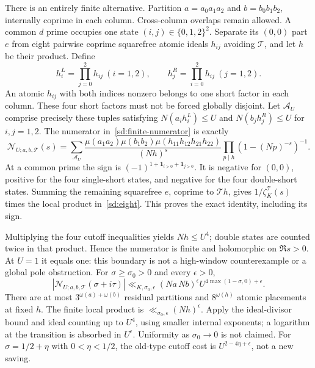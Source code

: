 There is an entirely finite alternative. Partition
$a=a_0a_1a_2$ and $b=b_0b_1b_2$, internally coprime in each column.
Cross-column overlaps remain allowed. A common $d$ prime occupies one
state $(i,j)\in\{0,1,2\}^2$. Separate its $(0,0)$ part $e$ from eight
pairwise coprime squarefree atomic ideals $h_{ij}$ avoiding $\mathcal T$,
and let $h$ be their product. Define
\[
 h_i^L=\prod_{j=0}^2h_{ij}\ (i=1,2),\qquad
 h_j^R=\prod_{i=0}^2h_{ij}\ (j=1,2).
\]
An atomic $h_{ij}$ with both indices nonzero belongs to one short
factor in each column. These four short factors must not be forced
globally disjoint. Let $\mathcal A_U$ comprise precisely these tuples
satisfying
$N(a_i h_i^L)\le U$ and $N(b_jh_j^R)\le U$ for $i,j=1,2$.
The numerator in~\eqref{sd:finite-numerator} is exactly
\begin{equation}\label{sd:eight}
 \mathcal N_{U;a,b,\mathcal T}(s)=
 \sum_{\mathcal A_U}
 \frac{\mu(a_1a_2)\mu(b_1b_2)
       \mu(h_{11}h_{12}h_{21}h_{22})}{(Nh)^s}
       \prod_{p\mid h}(1-(Np)^{-s})^{-1}.
\end{equation}
At a common prime the sign is
$(-1)^{1+\mathbf1_{i>0}+\mathbf1_{j>0}}$.
It is negative for $(0,0)$, positive for the four single-short states,
and negative for the four double-short states. Summing the remaining
squarefree $e$, coprime to $\mathcal T h$, gives
$1/\zeta_K^{\mathcal T}(s)$ times the local product in~\eqref{sd:eight}.
This proves the exact identity, including its sign.

Multiplying the four cutoff inequalities yields $Nh\le U^4$; double
states are counted twice in that product. Hence the numerator is finite
and holomorphic on $\Re s>0$. At $U=1$ it equals one: this boundary is
not a high-window counterexample or a global pole obstruction.
For $\sigma\ge\sigma_0>0$ and every $\epsilon>0$,
\begin{equation}\label{sd:numerator-bound}
 |\mathcal N_{U;a,b,\mathcal T}(\sigma+i\tau)|
 \ll_{K,\sigma_0,\epsilon}(Na\,Nb)^\epsilon
               U^{4\max(1-\sigma,0)+\epsilon}.
\end{equation}
There are at most $3^{\omega(a)+\omega(b)}$ residual partitions and
$8^{\omega(h)}$ atomic placements at fixed $h$. The finite local product
is $\ll_{\sigma_0,\epsilon}(Nh)^\epsilon$. Apply the ideal-divisor bound
and ideal counting up to $U^4$, using smaller internal exponents; a
logarithm at the transition is absorbed in $U^\epsilon$.
Uniformity as $\sigma_0\to0$ is not claimed. For
$\sigma=1/2+\eta$ with $0<\eta<1/2$, the old-type cutoff cost is
$U^{2-4\eta+\epsilon}$, not a new saving.

